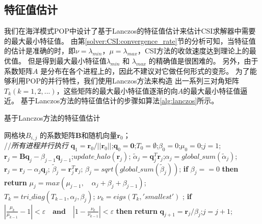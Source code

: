 \subsection{特征值估计}
\label{solver:eigs}
我们在海洋模式POP中设计了基于Lanczos的特征值估计来估计CSI求解器中需要的最大最小特征值。
由第\ref{solver:CSI:convergence_rate}节的分析可知，当特征值的估计是准确的时，即$\nu = \lambda_{min}$，$\mu =\lambda_{max}$，CSI方法的收敛速度达到理论上的最优值。 
但是得到最大最小特征值$\lambda_{min}$ 和 $\lambda_{max}$ 的精确值是很困难的。
另外，由于系数矩阵$A$ 是分布在各个进程上的，因此不建议对它做任何形式的变形。  
为了能够利用POP的并行特性，我们使用Lanczos方法来构造 出一系列三对角矩阵$T_k(k=1,2,...)$，这些矩阵的最大最小特征值逐渐的向$A$的最大最小特征值逼近。
基于Lanczos方法的特征值估计的步骤如算法\ref{alg:lanczos}所示。 
\begin{algorithm}
\caption{ 基于Lanczos方法的特征值估计}
\label{alg:lanczos}
\begin{algorithmic}[1]
\REQUIRE  网格块$B_{i,j}$ 的系数矩阵$\textbf{B}$和随机向量$\textbf{r}_0$；\\
 //\qquad    \textit{所有进程并行执行}
\STATE $\textbf{q}_1 = \textbf{r}_0/||\textbf{r}_0||$;\quad $\textbf{q}_0=\textbf{0}$;\quad $T_0=\emptyset$;\quad $\beta_0 =0$;\quad  $\mu_0 =0$;\quad $j=1$;
\STATE $\textbf{r}_j=\textbf{B}\textbf{q}_j-\beta_{j-1}\textbf{q}_{j-1}$;\quad $update\_halo(\textbf{r}_j)$;
\STATE $\tilde{\alpha}_j =\textbf{q}_j^T\textbf{r}_j$;\quad $\alpha_j=global\_sum(\tilde{\alpha}_j)$; 
\STATE $\textbf{r}_j=\textbf{r}_j-\alpha_{j}\textbf{q}_{j}$;
\STATE $\tilde{\beta}_j = \textbf{r}_j^T\textbf{r}_j$; \quad $\beta_j=sqrt(global\_sum(\tilde{\beta}_j))$;
\STATE \textbf{if} $\beta_j == 0$ \textbf{then} \textbf{return}
\STATE $\mu_j = max(\mu_{j-1}, \quad \alpha_j+\beta_j+\beta_{j-1})$; \label{lanczos_gersh} \\
\STATE $T_k=tri\_diag(T_{k-1},\alpha_j,\beta_j)$; \quad $\nu_k = eigs(T_k,'smallest')$ ; \label{lanczos_tridiag} 
\STATE \textbf{if} $|\frac{\mu_k}{\mu_{k-1}} -1 |< \varepsilon\quad\textbf{and}\quad|1- \frac{\nu_k}{\nu_{k-1}}|< \varepsilon$ \textbf{then} \textbf{return}
\STATE $\textbf{q}_{j+1}= \textbf{r}_j/\beta_j$;\quad $j=j+1$;
\ENDWHILE
\end{algorithmic}
\end{algorithm}
 
